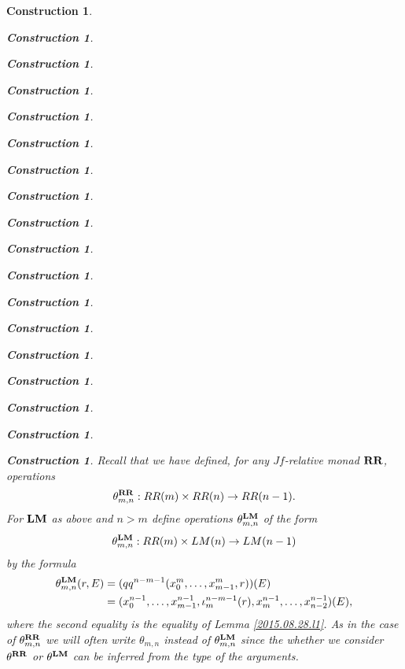 \documentclass[onecolumn,12pt]{amsart}
\numberwithin{proposition}{subsection}
\newtheorem{construction}[proposition]{Construction}
\newcommand{\sr}{\rightarrow}
\newcommand{\RR}{{\bf RR}}
\newcommand{\LM}{{\bf LM}}
\begin{document}
\begin{construction}
\begin{construction}
\begin{construction}
\begin{construction}
\begin{construction}
\begin{construction}
\begin{construction}
\begin{construction}
\begin{construction}
\begin{construction}
\begin{construction}
\begin{construction}
\begin{construction}
\begin{construction}
\begin{construction}
\begin{construction}
\begin{construction}
\begin{construction}
Recall that we have defined, for any $Jf$-relative monad $\RR$, operations 
%
$$\theta^{\RR}_{m,n}:RR(m)\times RR(n)\sr RR(n-1).$$
% 
For $\LM$ as above and $n>m$ define operations $\theta^{\LM}_{m,n}$ of the form
%
$$\theta^{\LM}_{m,n}:RR(m)\times LM(n)\sr LM(n-1)$$
%
by the formula
%
\begin{equation}\label{2015.09.07.eq2}
  \begin{split}
    \theta^{\LM}_{m,n}(r,E)&=(qq^{n-m-1}(x_0^m,\dots,x_{m-1}^m,r))(E)\\
                          &=(x_0^{n-1},\dots,x_{m-1}^{n-1},\iota_m^{n-m-1}(r),x_m^{n-1},\dots, x_{n-2}^{n-1})(E),
  \end{split}
\end{equation}%
%
where the second equality is the equality of Lemma \ref{2015.08.28.l1}. As in
the case of $\theta^{\RR}_{m,n}$ we will often write $\theta_{m,n}$ instead of
$\theta^{\LM}_{m,n}$ since the whether we consider $\theta^{\RR}$ or
$\theta^{\LM}$ can be inferred from the type of the arguments.


\end{construction}
\end{construction}
\end{construction}
\end{construction}
\end{construction}
\end{construction}
\end{construction}
\end{construction}
\end{construction}
\end{construction}
\end{construction}
\end{construction}
\end{construction}
\end{construction}
\end{construction}
\end{construction}
\end{construction}
\end{construction}
\end{document}
